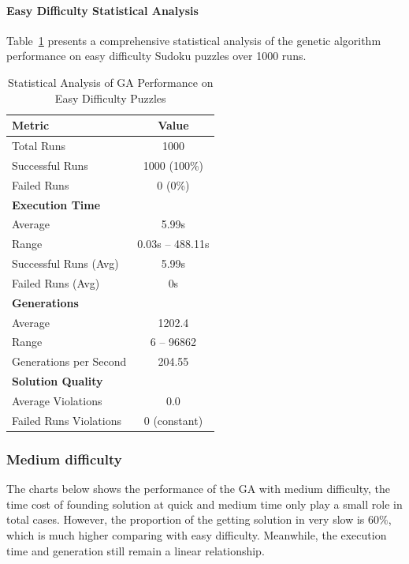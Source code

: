 \paragraph{Easy Difficulty Statistical Analysis}

Table~\ref{tab:easy_difficulty_stats} presents a comprehensive statistical analysis of the genetic algorithm performance on easy difficulty Sudoku puzzles over 1000 runs.

\begin{table}[H]
\centering
\caption{Statistical Analysis of GA Performance on Easy Difficulty Puzzles}
\label{tab:easy_difficulty_stats}
\begin{tabular}{@{}lc@{}}
\toprule
\textbf{Metric} & \textbf{Value} \\
\midrule
Total Runs & 1000 \\
Successful Runs & 1000 (100\%) \\
Failed Runs & 0 (0\%) \\
\midrule
\textbf{Execution Time} & \\
Average & 5.99s \\
Range & 0.03s -- 488.11s\\
Successful Runs (Avg) & 5.99s \\
Failed Runs (Avg) & 0s \\
\midrule
\textbf{Generations} & \\
Average & 1202.4 \\
Range & 6 -- 96862 \\
Generations per Second & 204.55 \\
\midrule
\textbf{Solution Quality} & \\
Average Violations & 0.0 \\
Failed Runs Violations & 0 (constant) \\
\bottomrule
\end{tabular}
\end{table}

\subsubsection{Medium difficulty}

The charts below shows the performance of the GA with medium difficulty, the time cost of founding solution at quick and medium time only play a small role in total cases.
However, the proportion of the getting solution in very slow is $60\%$, which is much higher comparing with easy difficulty.
Meanwhile, the execution time and generation still remain a linear relationship.


